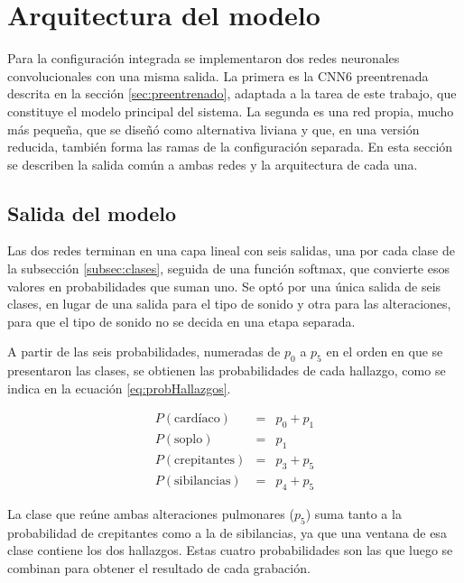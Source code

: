 
\section{Arquitectura del modelo}
\label{sec:arquitecturaModelo}

Para la configuración integrada se implementaron dos redes neuronales convolucionales con una misma
salida. La primera es la CNN6 preentrenada descrita en la sección \ref{sec:preentrenado}, adaptada
a la tarea de este trabajo, que constituye el modelo principal del sistema. La segunda es una red
propia, mucho más pequeña, que se diseñó como alternativa liviana y que, en una versión reducida,
también forma las ramas de la configuración separada. En esta sección se describen la salida común
a ambas redes y la arquitectura de cada una.

\subsection{Salida del modelo}
\label{subsec:salida}

Las dos redes terminan en una capa lineal con seis salidas, una por cada clase de la subsección
\ref{subsec:clases}, seguida de una función softmax, que convierte esos valores en probabilidades
que suman uno. Se optó por una única salida de seis clases, en lugar de una salida para el tipo de
sonido y otra para las alteraciones, para que el tipo de sonido no se decida en una etapa separada.

A partir de las seis probabilidades, numeradas de $p_0$ a $p_5$ en el orden en que se presentaron
las clases, se obtienen las probabilidades de cada hallazgo, como se indica en la ecuación
\ref{eq:probHallazgos}.

\begin{equation}
	\label{eq:probHallazgos}
	\begin{array}{rcl}
		P(\text{cardíaco}) & = & p_0 + p_1 \\
		P(\text{soplo}) & = & p_1 \\
		P(\text{crepitantes}) & = & p_3 + p_5 \\
		P(\text{sibilancias}) & = & p_4 + p_5
	\end{array}
\end{equation}

La clase que reúne ambas alteraciones pulmonares ($p_5$) suma tanto a la probabilidad de
crepitantes como a la de sibilancias, ya que una ventana de esa clase contiene los dos hallazgos.
Estas cuatro probabilidades son las que luego se combinan para obtener el resultado de cada
grabación.

